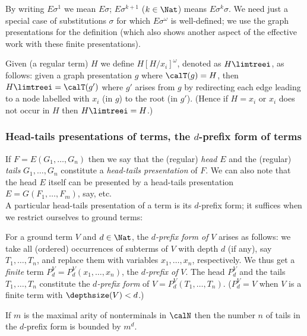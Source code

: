 \documentclass[12pt]{article}
\begin{document}
By writing $E\sigma^1$ we mean $E\sigma$;  $E\sigma^{k+1}$
($k\in\Nat$) means $E\sigma^k\sigma$.
We need just a  special case of substitutions
$\sigma$ for which $E\sigma^{\omega}$ 
is well-defined; we use the graph presentations for the definition
(which also shows another aspect of the effective work with these
finite presentations).

\begin{defn}
Given (a regular term) $H$ we define $H[H/x_i]^{\omega}$, denoted as
$H\limtreei$, as follows: given a graph presentation $g$ where
$\calT(g)=H$, then $H\limtreei=\calT(g')$ where $g'$ arises from $g$
by redirecting each edge leading to a node labelled
with $x_i$ (in $g$) to the root (in $g'$).
(Hence if $H=x_i$ or $x_i$
does not occur in $H$ then 
$H\limtreei=H$.)
\end{defn}





\subsubsection*{Head-tails presentations of terms,
the $d$-prefix form of terms}

If $F=E(G_1,\dots,G_n)$ then we say that 
the (regular) \emph{head} $E$ and the (regular)
\emph{tails}  $G_1,\dots,G_n$ constitute a 
\emph{head-tails presentation} of $F$. 
We can also note that
the head $E$ itself can be presented by a head-tails
presentation $E=G(F_1,\dots,F_m)$, say, etc. 
\\
A particular head-tails presentation of a term is its 
$d$-prefix form; it suffices when we restrict ourselves to ground terms:

\begin{defn}\label{def:dprefix}
For a ground term $V$ and $d\in\Nat$, the
\emph{$d$-prefix
form of} $V$ arises as follows:
we take all (ordered) occurrences of subterms of $V$ with depth $d$ (if
any), say $T_1,\dots,T_n$, 
and replace them with variables $x_1,\dots,x_n$,
respectively. We thus get a \emph{finite} term
$P^V_d=P^V_d(x_1,\dots,x_n)$, 
the \emph{$d$-prefix of}
$V$. 
The head $P^V_d$ and the tails $T_1,\dots,T_n$ constitute the
\emph{$d$-prefix form} of $V=P^V_d(T_1,\dots,T_n)$. 
($P^V_d=V$ when $V$ is a finite term with $\depthsize(V)<d$.)
\end{defn}
\begin{observ}\label{prop:boundtails}
If $m$ is the maximal arity of nonterminals in $\calN$
then the number $n$ of tails in the
$d$-prefix form is bounded by $m^d$.
\end{observ}
\end{document}
